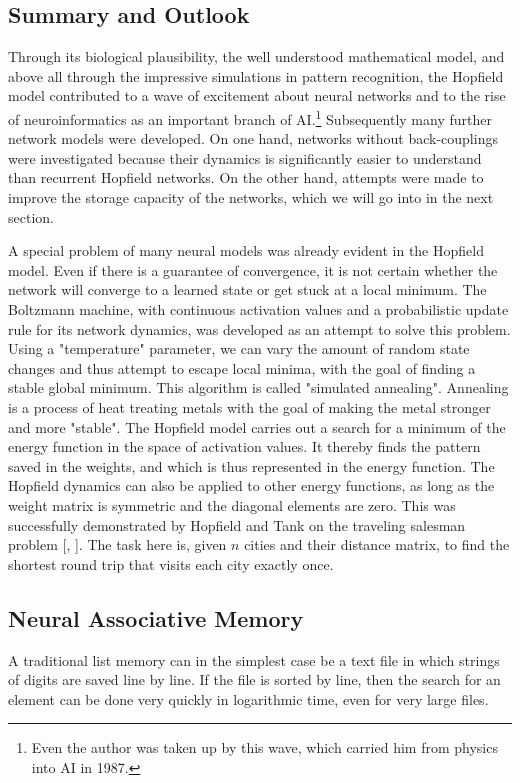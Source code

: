 \documentclass[10pt]{book}
\begin{document}
\subsection{Summary and Outlook}
Through its biological plausibility, the well understood mathematical model, and above all through the impressive simulations in pattern recognition, the Hopfield model contributed to a wave of excitement about neural networks and to the rise of neuroinformatics as an important branch of AI.\footnote{Even the author was taken up by this wave, which carried him from physics into AI in 1987.} Subsequently many further network models were developed. On one hand, networks without back-couplings were investigated because their dynamics is significantly easier to understand than recurrent Hopfield networks. On the other hand, attempts were made to improve the storage capacity of the networks, which we will go into in the next section.

A special problem of many neural models was already evident in the Hopfield model. Even if there is a guarantee of convergence, it is not certain whether the network will converge to a learned state or get stuck at a local minimum. The Boltzmann machine, with continuous activation values and a probabilistic update rule for its network dynamics, was developed as an attempt to solve this problem. Using a "temperature" parameter, we can vary the amount of random state changes and thus attempt to escape local minima, with the goal of finding a stable global minimum. This algorithm is called "simulated annealing". Annealing is a process of heat treating metals with the goal of making the metal stronger and more "stable".
The Hopfield model carries out a search for a minimum of the energy function in the space of activation values. It thereby finds the pattern saved in the weights, and which is thus represented in the energy function. The Hopfield dynamics can also be applied to other energy functions, as long as the weight matrix is symmetric and the diagonal elements are zero. This was successfully demonstrated by Hopfield and Tank on the traveling salesman problem [\cite{hopfield1985optimization}, \cite{zell1994simulation}]. The task here is, given $n$ cities and their distance matrix, to find the shortest round trip that visits each city exactly once.

\subsection{Neural Associative Memory}
A traditional list memory can in the simplest case be a text file in which strings of digits are saved line by line. If the file is sorted by line, then the search for an element can be done very quickly in logarithmic time, even for very large files.
\end{document}
